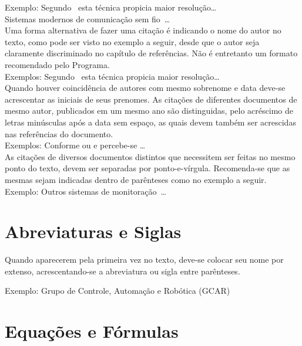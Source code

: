\documentclass[repeatfields,xlists,xpacks,oneside,yearsonly]{ufrgscca}
\begin{document}
\begin{appendix}
Exemplo: Segundo~\cite{Brito:IEE-1994} esta técnica propicia maior
resolução\ldots\\

Sistemas modernos de comunicação sem fio~\cite{Bilstrup:FCS-239}\ldots\\

Uma forma alternativa de fazer uma citação é indicando o nome do autor no
texto, como pode ser visto no exemplo a seguir, desde que o autor seja
claramente discriminado no capítulo de referências. Não é entretanto um
formato recomendado pelo Programa.\\

Exemplos: Segundo~\textcite{Brito:IEE-1994} esta técnica propicia maior
resolução\ldots\\

Quando houver coincidência de autores com mesmo sobrenome e data deve-se
acrescentar as iniciais de seus prenomes. As citações de diferentes
documentos de mesmo autor, publicados em um mesmo ano são distinguidas, pelo
acréscimo de letras minúsculas após a data sem espaço, as quais devem também
ser acrescidas nas referências do documento.\\

Exemplos: Conforme \cite{Pereira:OORT1999-133} ou \cite{Pereira:OORT1999-155} e
\cite{Pereira:RTP1999-9} percebe-se \ldots\\

As citações de diversos documentos distintos que necessitem ser feitas no
mesmo ponto do texto, devem ser separadas por ponto-e-vírgula. Recomenda-se
que as mesmas sejam indicadas dentro de parênteses como no exemplo a
seguir.\\

Exemplo: Outros sistemas de
monitoração~\cite{Baturone:DCIS1996-231,Cota:TIM-49-2}\ldots\\

\section{Abreviaturas e Siglas}

Quando aparecerem pela primeira vez no texto, deve-se colocar seu nome por
extenso, acrescentando-se a abreviatura ou sigla entre parênteses.

Exemplo:   Grupo de Controle, Automação e Robótica (GCAR)

\section{Equações e Fórmulas}


\end{appendix}
\end{document}
